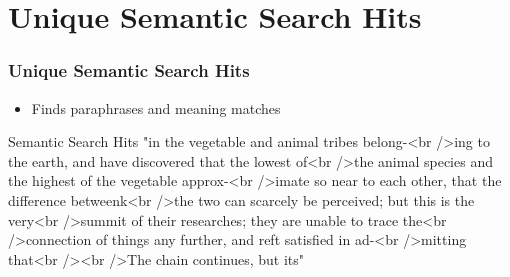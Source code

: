 \documentclass[pdf]{beamer}
\begin{document}
\section{Unique Semantic Search Hits}


\begin{frame}
  \frametitle{Unique Semantic Search Hits}
  \begin{itemize}
    \item Finds paraphrases and meaning matches
  \end{itemize}
  \begin{block}{Semantic Search Hits}
    "in the vegetable and animal tribes belong-\textless{}br /\textgreater{}ing to the earth, and have discovered that the lowest of\textless{}br /\textgreater{}the animal species and the highest of the vegetable approx-\textless{}br /\textgreater{}imate so near to each other, that the difference betweenk\textless{}br /\textgreater{}the two can scarcely be perceived; but this is the very\textless{}br /\textgreater{}summit of their researches; they are unable to trace the\textless{}br /\textgreater{}connection of things any further, and reft satisfied in ad-\textless{}br /\textgreater{}mitting that\textless{}br /\textgreater{}\textless{}br /\textgreater{}The chain continues, but its"
  \end{block}
\end{frame}
\end{document}
